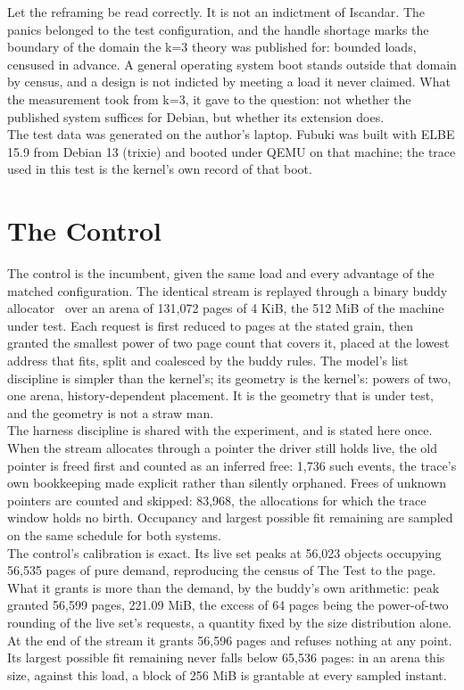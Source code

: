 \documentclass{article}
\begin{document}
Let the reframing be read correctly. It is not an indictment of Iscandar. The panics belonged to the test configuration, and the handle shortage marks the boundary of the domain the k=3 theory was published for: bounded loads, censused in advance. A general operating system boot stands outside that domain by census, and a design is not indicted by meeting a load it never claimed. What the measurement took from k=3, it gave to the question: not whether the published system suffices for Debian, but whether its extension does.\\

The test data was generated on the author's laptop. Fubuki was built with ELBE 15.9 from Debian 13 (trixie) and booted under QEMU on that machine; the trace used in this test is the kernel's own record of that boot.

\section{The Control}

The control is the incumbent, given the same load and every advantage of the matched configuration. The identical stream is replayed through a binary buddy allocator~\cite{knuth1997art1} over an arena of 131,072 pages of 4 KiB, the 512 MiB of the machine under test. Each request is first reduced to pages at the stated grain, then granted the smallest power of two page count that covers it, placed at the lowest address that fits, split and coalesced by the buddy rules. The model's list discipline is simpler than the kernel's; its geometry is the kernel's: powers of two, one arena, history-dependent placement. It is the geometry that is under test, and the geometry is not a straw man.\\

The harness discipline is shared with the experiment, and is stated here once. When the stream allocates through a pointer the driver still holds live, the old pointer is freed first and counted as an inferred free: 1,736 such events, the trace's own bookkeeping made explicit rather than silently orphaned. Frees of unknown pointers are counted and skipped: 83,968, the allocations for which the trace window holds no birth. Occupancy and largest possible fit remaining are sampled on the same schedule for both systems.\\

The control's calibration is exact. Its live set peaks at 56,023 objects occupying 56,535 pages of pure demand, reproducing the census of The Test to the page. What it grants is more than the demand, by the buddy's own arithmetic: peak granted 56,599 pages, 221.09 MiB, the excess of 64 pages being the power-of-two rounding of the live set's requests, a quantity fixed by the size distribution alone. At the end of the stream it grants 56,596 pages and refuses nothing at any point. Its largest possible fit remaining never falls below 65,536 pages: in an arena this size, against this load, a block of 256 MiB is grantable at every sampled instant.\\
\end{document}
